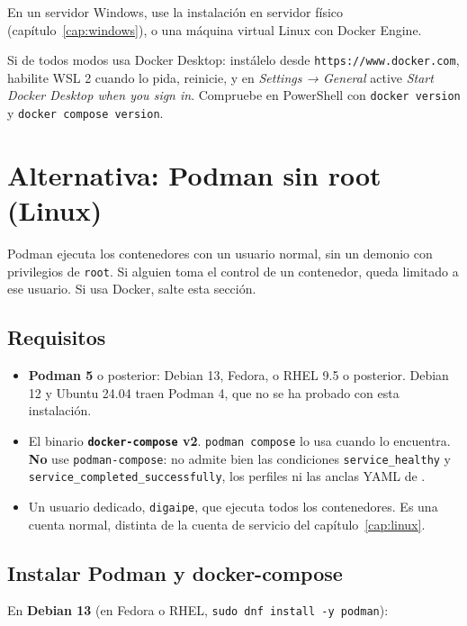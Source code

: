 \begin{nota}[Recomendación]
	En un servidor Windows, use la instalación en servidor físico (capítulo~\ref{cap:windows}),
	o una máquina virtual Linux con Docker Engine.
\end{nota}

Si de todos modos usa Docker Desktop: instálelo desde \texttt{https://www.docker.com}, habilite
WSL 2 cuando lo pida, reinicie, y en \emph{Settings → General} active \emph{Start Docker Desktop
when you sign in}. Compruebe en PowerShell con \texttt{docker version} y
\texttt{docker compose version}.

\section{Alternativa: Podman sin root (Linux)}
\label{sec:podman}

Podman ejecuta los contenedores con un usuario normal, sin un demonio con privilegios de
\texttt{root}. Si alguien toma el control de un contenedor, queda limitado a ese usuario. Si usa
Docker, salte esta sección.

\subsection{Requisitos}

\begin{itemize}
	\item \textbf{Podman 5} o posterior: Debian 13, Fedora, o RHEL 9.5 o posterior. Debian 12 y
	      Ubuntu 24.04 traen Podman 4, que no se ha probado con esta instalación.
	\item El binario \textbf{\texttt{docker-compose} v2}. \texttt{podman compose} lo usa cuando
	      lo encuentra. \textbf{No} use \texttt{podman-compose}: no admite bien las condiciones
	      \texttt{service\_healthy} y \texttt{service\_completed\_successfully}, los perfiles ni
	      las anclas YAML de .
	\item Un usuario dedicado, \texttt{digaipe}, que ejecuta todos los contenedores. Es una cuenta
	      normal, distinta de la cuenta de servicio del capítulo~\ref{cap:linux}.
\end{itemize}

\subsection{Instalar Podman y docker-compose}

En \textbf{Debian 13} (en Fedora o RHEL, \texttt{sudo dnf install -y podman}):

